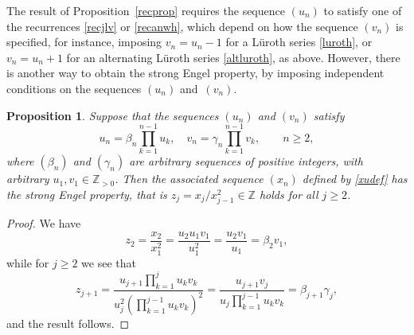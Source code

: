 \documentclass[12pt,a4paper]{amsart}
\newtheorem{proposition}[theorem]{Proposition}
\theoremstyle{definition}
\numberwithin{equation}{section}
\newcommand\bet{{\beta}}
\newcommand\gam{{\gamma}}
\newcommand{\Z}{\mathbb{Z}}
\begin{document}
The %
result of Proposition~\ref{recprop} 
requires the sequence $(u_n)$ to satisfy one of the 
recurrences \eqref{recjlv} or \eqref{recanwh}, which depend on how the 
sequence $(v_n)$ is specified, for instance, imposing $v_n=u_n-1$ 
for a L\"uroth series \eqref{luroth}, or %
$v_n=u_n+1$ %
for an alternating L\"uroth series \eqref{altluroth}, as above. 
However, there is another way to obtain the strong Engel property, by imposing 
independent conditions on the sequences $(u_n)$ and~$(v_n)$. 

\begin{proposition} 
Suppose that the sequences $(u_n)$ and $(v_n)$ satisfy 
\begin{equation}
\label{recuv}
u_n = \bet_{n} \prod_{k=1}^{n-1} u_{k}, 
\quad v_n = \gam_{n} \prod_{k=1}^{n-1} v_{k}, \qquad n\geq 2, 
\end{equation} 
where 
$(\bet_n)$ and $(\gam_n)$ are arbitrary sequences of positive integers, with 
arbitrary $u_1,v_1\in\Z_{>0}$. 
Then the associated sequence $(x_n)$ defined by \eqref{xudef} has the strong Engel property, that is 
$z_j =x_{j}/x_{j-1}^2 \in \Z$ holds for all $j\geq 2$. 
\end{proposition} 

\begin{proof} 
We have 
\[
z_2 = \frac{x_2}{x_1^2} = \frac{u_2u_1v_1}{u_1^2} = \frac{u_2v_1}{u_1} = \bet_2v_1, 
\]
while 
for $j\geq 2$ we see that 
\[  
z_{j+1} = \frac{u_{j+1}\prod_{k=1}^ju_kv_k}{u_j^2\left(\prod_{k=1}^{j-1}u_kv_k\right)^2} %
= \frac{u_{j+1}v_j}{u_j\prod_{k=1}^{j-1} u_k v_k } %
= \beta_{j+1}\gam_j, 
\] 
and the result follows. 
\end{proof} 
\end{document}
